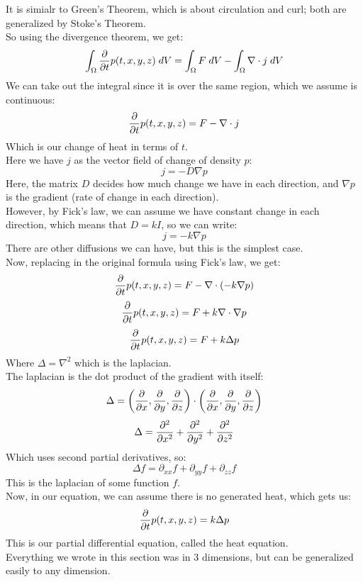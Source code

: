 \documentclass[12pt]{article}
\begin{document}
It is simialr to Green's Theorem,
which is about circulation and curl;
both are generalized by Stoke's Theorem. \\

So using the divergence theorem, we get:
\[ \int_\Omega \dfrac{\partial }{\partial t} p(t, x, y, z) \; dV
= \int_\Omega F \; dV
- \int_{\Omega} \nabla \cdot j \; dV \]
We can take out the integral since it
is over the same region, which we assume is
continuous:
\[  \dfrac{\partial }{\partial t} p(t, x, y, z)
= F - \nabla \cdot j \]
Which is our change of heat in terms of $t$. \\

Here we have $j$ as the vector
field of change of density $p$:
\[ j = -D\nabla p \]
Here, the matrix $D$
decides how much change we have in each
direction, and $\nabla p$ is the gradient
(rate of change in each direction). \\
However, by Fick's law,
we can assume we have constant change
in each direction, which means that
$D = kI$, so we can write:
\[ j = -k\nabla p \]
There are other diffusions we can have,
but this is the simplest case. \\

Now, replacing in the original formula
using Fick's law, we get:
\[  \dfrac{\partial }{\partial t} p(t, x, y, z)
= F - \nabla \cdot (-k\nabla p) \]
\[  \dfrac{\partial }{\partial t} p(t, x, y, z)
= F + k \nabla \cdot \nabla p \]
\[  \dfrac{\partial }{\partial t} p(t, x, y, z)
= F + k \Delta p \]
Where $\Delta = \nabla^2$ which is
the laplacian. \\

The laplacian is the dot product of
the gradient with itself:
\[ \Delta = \left( \dfrac{\partial }{\partial x}, 
\dfrac{\partial }{\partial y}, \dfrac{\partial }{\partial z} \right)
\cdot \left( \dfrac{\partial }{\partial x}, 
\dfrac{\partial }{\partial y}, \dfrac{\partial }{\partial z} \right) \]
\[ \Delta = \dfrac{\partial ^2}{\partial x^2} +
\dfrac{\partial ^2}{\partial y^2} + \dfrac{\partial ^2}{\partial z^2} \]
Which uses second partial derivatives, so:
\[ \Delta f = \partial_{xx} f + 
\partial_{yy} f + \partial_{zz} f \]
This is the laplacian of some function $f$. \\

Now, in our equation,
we can assume there is no generated
heat, which gets us:
\[ \dfrac{\partial }{\partial t} p(t, x, y, z) = k \Delta p \]
This is our partial differential equation,
called the heat equation. \\

Everything we wrote in this section was
in $3$ dimensions, but can be generalized
easily to any dimension. \\ 

\newpage
\end{document}
